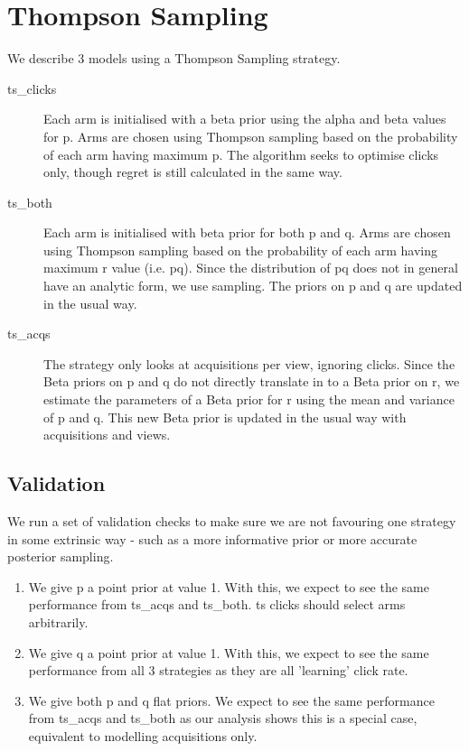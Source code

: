 \documentclass[11pt,a4,singlespacing,titlepagenumber=on]{scrreprt}
\numberwithin{equation}{chapter} %
\theoremstyle{remark}
\begin{document}
\section{Thompson Sampling}

We describe 3 models using a Thompson Sampling strategy.

\begin{description}
	\item[ts\_clicks] Each arm is initialised with a beta prior using the alpha and beta values for p. Arms are chosen using Thompson sampling based on the probability of each arm having maximum p. The algorithm seeks to optimise clicks only, though regret is still calculated in the same way.
	\item[ts\_both] Each arm is initialised with beta prior for both p and q. Arms are chosen using Thompson sampling based on the probability of each arm having maximum r value (i.e. pq). Since the distribution of pq does not in general have an analytic form, we use sampling. The priors on p and q are updated in the usual way.
	\item[ts\_acqs] The strategy only looks at acquisitions per view, ignoring clicks. Since the Beta priors on p and q do not directly translate in to a Beta prior on r, we estimate the parameters of a Beta prior for r using the mean and variance of p and q. This new Beta prior is updated in the usual way with acquisitions and views.
\end{description}

\subsection{Validation}

We run a set of validation checks to make sure we are not favouring one strategy in some extrinsic way - such as a more informative prior or more accurate posterior sampling.

\begin{enumerate}
	\item  We give p a point prior at value 1. With this, we expect to see the same performance from ts\_acqs and ts\_both. ts clicks should select arms arbitrarily.
	\item  We give q a point prior at value 1. With this, we expect to see the same performance from all 3 strategies as they are all 'learning' click rate.
	\item  We give both p and q flat priors. We expect to see the same performance from ts\_acqs and ts\_both as our analysis shows this is a special case, equivalent to modelling acquisitions only.
\end{enumerate}
\end{document}
